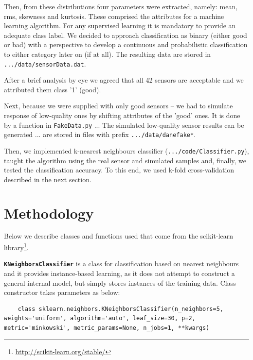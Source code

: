 \documentclass[a4paper,10pt]{article}
\begin{document}
Then, from these distributions four parameters were extracted, namely: mean, rms, skewness and kurtosis. These comprised the attributes for a machine learning algorithm. For any supervised learning it is mandatory to provide an adequate class label. We decided to approach classification as binary (either good or bad) with a perspective to develop a continuous and probabilistic classification to either category later on (if at all).
The resulting data are stored in \texttt{.../data/sensorData.dat}.


After a brief analysis by eye we agreed that all 42 sensors are acceptable and we attributed them class '1' (good).


Next, because we were supplied with only good sensors -- we had to simulate response of low-quality ones by shifting attributes of the 'good' ones. It is done by a function in \texttt{FakeData.py} ...
The simulated low-quality sensor results can be generated ...
are stored in files with prefix \texttt{.../data/danefake*}.

Then, we implemented k-nearest neighbours classifier (\texttt{.../code/Classifier.py}), taught the algorithm using the real sensor and simulated samples and, finally, we tested the classification accuracy. To this end, we used k-fold cross-validation described in the next section.





\section{Methodology}
Below we describe classes and functions used that come from the scikit-learn library\footnote{\url{http://scikit-learn.org/stable/}}.

\textbf{\texttt{KNeighborsClassifier}} is a class for classification based on nearest neighbours and it provides instance-based learning, as it does not attempt to construct
a general internal model, but simply stores instances of the training data. Class constructor takes parameters as below:
\begin{lstlisting}
	class sklearn.neighbors.KNeighborsClassifier(n_neighbors=5, weights='uniform', algorithm='auto', leaf_size=30, p=2, metric='minkowski', metric_params=None, n_jobs=1, **kwargs)
\end{lstlisting}
\end{document}
